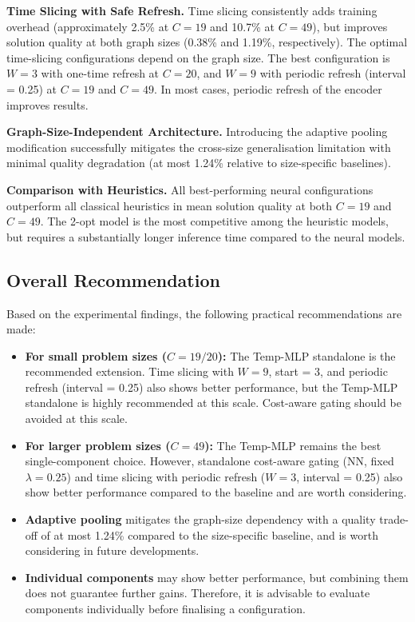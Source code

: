 \textbf{Time Slicing with Safe Refresh.}
Time slicing consistently adds training overhead (approximately 2.5\% at $C = 19$ and 10.7\%
at $C = 49$), but improves solution quality at both graph sizes (0.38\% and 1.19\%,
respectively). The optimal time-slicing configurations depend on the graph size. The best
configuration is $W = 3$ with one-time refresh at $C = 20$, and $W = 9$ with periodic
refresh (interval = 0.25) at $C = 19$ and $C = 49$. In most cases, periodic refresh of
the encoder improves results.

\textbf{Graph-Size-Independent Architecture.}
Introducing the adaptive pooling modification successfully mitigates the cross-size
generalisation limitation with minimal quality degradation (at most 1.24\% relative to
size-specific baselines).

\textbf{Comparison with Heuristics.}
All best-performing neural configurations outperform all classical heuristics in mean solution
quality at both $C = 19$ and $C = 49$. The 2-opt model is the most competitive among the
heuristic models, but requires a substantially longer inference time compared to the neural
models.

\subsection{Overall Recommendation}
\label{subsec:overall_recommendation}

Based on the experimental findings, the following practical recommendations are made:

\begin{itemize}
    \item \textbf{For small problem sizes ($C = 19/20$):} The Temp-MLP standalone is the
    recommended extension. Time slicing with $W = 9$, start = 3, and periodic refresh
    (interval = 0.25) also shows better performance, but the Temp-MLP standalone is highly
    recommended at this scale. Cost-aware gating should be avoided at this scale.

    \item \textbf{For larger problem sizes ($C = 49$):} The Temp-MLP remains the best
    single-component choice. However, standalone cost-aware gating (NN, fixed $\lambda =
    0.25$) and time slicing with periodic refresh ($W = 3$, interval = 0.25) also show
    better performance compared to the baseline and are worth considering.

    \item \textbf{Adaptive pooling} mitigates the graph-size dependency with a quality
    trade-off of at most 1.24\% compared to the size-specific baseline, and is worth
    considering in future developments.

    \item \textbf{Individual components} may show better performance, but combining them
    does not guarantee further gains. Therefore, it is advisable to evaluate components
    individually before finalising a configuration.
\end{itemize}


